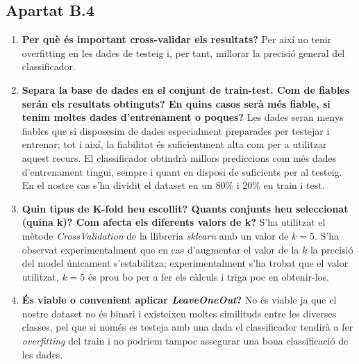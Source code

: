 \documentclass[a4paper, 11pt]{article}
\begin{document}
\subsection{Apartat B.4}
\begin{enumerate}
    \item \textbf{Per què és important cross-validar els resultats?} Per així no tenir overfitting en les dades de testeig i, per tant, millorar la precisió general del classificador.
    \item \textbf{Separa la base de dades en el conjunt de train-test. Com de fiables serán els resultats obtinguts? En quins casos serà més fiable, si tenim moltes dades d'entrenament o poques?} Les dades seran menys fiables que si disposesim de dades especialment preparades per testejar i entrenar; tot i així, la fiabilitat és suficientment alta com per a utilitzar aquest recurs. El classificador obtindrà millors prediccions com més dades d'entrenament tingui, sempre i quant en disposi de suficients per al testeig.\\ En el nostre cas s'ha dividit el dataset en un 80\% i 20\% en train i test.
    \item \textbf{Quin tipus de K-fold heu escollit? Quants conjunts heu seleccionat (quina k)? Com afecta els diferents valors de k?} S'ha utilitzat el mètode \textit{CrossValidation} de la llibreria \textit{sklearn} amb un valor de $k = 5$. S'ha observat experimentalment que en cas d'augmentar el valor de la $k$ la precisió del model únicament s'estabilitza; experimentalment s'ha trobat que el valor utilitzat, $k = 5$ és prou bo per a fer els càlculs i triga poc en obtenir-los.
    \item \textbf{És viable o convenient aplicar \textit{LeaveOneOut}?} No és viable ja que el nostre dataset no és binari i existeixen moltes similituds entre les diverses classes, pel que si només es testeja amb una dada el classificador tendirà a fer \textit{overfitting} del train i no podriem tampoc assegurar una bona classificació de les dades.
\end{enumerate}
\newpage
\end{document}
